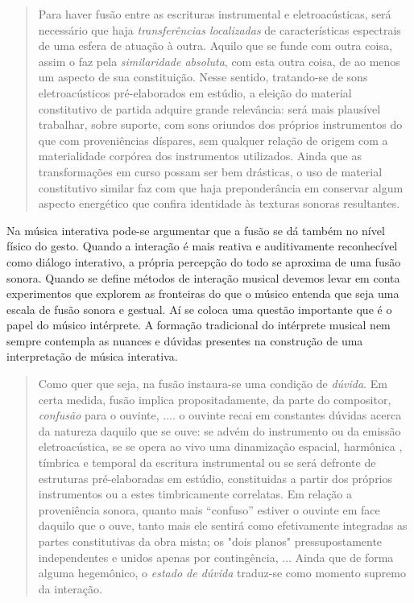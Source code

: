 \documentclass{ppgmus}
\begin{document}
\begin{quote}

Para haver fusão entre as escrituras instrumental e eletroacústicas,
será necessário que haja \textit{transferências localizadas} de 
características espectrais de uma esfera de atuação à outra.
Aquilo que se funde com outra coisa, assim o faz pela \textit{similaridade
absoluta}, com esta outra coisa, de ao menos um aspecto de sua 
constituição. Nesse sentido, tratando-se de sons eletroacústicos 
pré-elaborados em estúdio, a eleição do material constitutivo de partida
adquire grande relevância: será mais plausível trabalhar, sobre suporte,
com sons oriundos dos próprios instrumentos do que com proveniências
díspares, sem qualquer relação de origem com a materialidade corpórea
dos instrumentos utilizados. Ainda que as transformações em curso possam ser
bem drásticas, o uso de material constitutivo similar faz com que
haja preponderância em conservar algum aspecto energético que confira
identidade às texturas sonoras resultantes. \cite{menezes2006musica}
\end{quote}


Na música interativa pode-se argumentar que a fusão se dá também no nível
físico do gesto. Quando a interação é mais reativa e auditivamente reconhecível
como diálogo interativo, a própria percepção do todo se aproxima de uma
fusão sonora. Quando se define métodos de interação musical devemos levar
em conta experimentos que explorem as fronteiras do que o músico entenda
que seja uma escala de fusão sonora e gestual. Aí se coloca uma questão
importante que é o papel do músico intérprete. A formação tradicional
do intérprete musical nem sempre contempla as nuances e dúvidas presentes na construção
de uma interpretação de música interativa. 

\begin{quote}
Como quer que seja, na fusão instaura-se uma condição de \textit{dúvida}.
Em certa medida, fusão implica propositadamente, da parte do compositor,
\textit{confusão} para o ouvinte,
....
o ouvinte recai em constantes dúvidas
acerca da natureza daquilo que se ouve: se advém do instrumento ou da 
emissão eletroacústica, se se opera ao vivo uma dinamização espacial, harmônica
, tímbrica e temporal da escritura instrumental ou se será defronte de
estruturas pré-elaboradas em estúdio, constituidas a partir dos próprios
instrumentos ou a estes timbricamente correlatas. Em relação a proveniência
sonora, quanto mais ``confuso'' estiver o ouvinte em face daquilo que
o ouve, tanto mais ele sentirá como efetivamente integradas as partes
constitutivas da obra mista; os "dois planos" pressupostamente independentes
e unidos apenas por contingência,
... 
Ainda que de forma alguma hegemônico, o \textit{estado de
dúvida} traduz-se como momento supremo da interação. \cite{menezes2006musica}
\end{quote}
\end{document}
